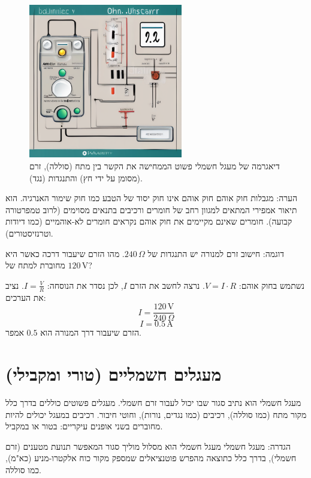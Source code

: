 \documentclass[12pt]{article}
\begin{document}
\begin{figure}[H]
  \centering
  \includegraphics[width=0.6\textwidth]{files/ohms_law_circuit.png}
  \caption{דיאגרמה של מעגל חשמלי פשוט הממחישה את הקשר בין מתח (סוללה), זרם (מסומן על ידי חץ) והתנגדות (נגד).}
\end{figure}

\begin{remarkBox}{הערה: מגבלות חוק אוהם}
חוק אוהם אינו חוק יסוד של הטבע כמו חוק שימור האנרגיה. הוא תיאור אמפירי המתאים למגוון רחב של חומרים ורכיבים בתנאים מסוימים (לרוב טמפרטורה קבועה). חומרים שאינם מקיימים את חוק אוהם נקראים חומרים לא-אוהמיים (כמו דיודות וטרנזיסטורים).
\end{remarkBox}

\begin{exampleBox}{דוגמה: חישוב זרם}
למנורה יש התנגדות של \(240 \, \Omega\). מהו הזרם שיעבור דרכה כאשר היא מחוברת למתח של \(120 \, \text{V}\)?

נשתמש בחוק אוהם: \(V = I \cdot R\). נרצה לחשב את הזרם \(I\), לכן נסדר את הנוסחה: \(I = \frac{V}{R}\).
נציב את הערכים:
\[I = \frac{120 \, \text{V}}{240 \, \Omega}\]
\[I = 0.5 \, \text{A}\]
הזרם שיעבור דרך המנורה הוא \(0.5\) אמפר.
\end{exampleBox}

\section{מעגלים חשמליים (טורי ומקבילי)}

מעגל חשמלי הוא נתיב סגור שבו יכול לעבור זרם חשמלי. מעגלים פשוטים כוללים בדרך כלל מקור מתח (כמו סוללה), רכיבים (כמו נגדים, נורות), וחוטי חיבור. רכיבים במעגל יכולים להיות מחוברים בשני אופנים עיקריים: בטור או במקביל.

\begin{definitionBox}{הגדרה: מעגל חשמלי}
מעגל חשמלי הוא מסלול מוליך סגור המאפשר תנועת מטענים (זרם חשמלי), בדרך כלל כתוצאה מהפרש פוטנציאלים שמספק מקור כוח אלקטרו-מניע (כא"מ), כמו סוללה.
\end{definitionBox}
\end{document}
